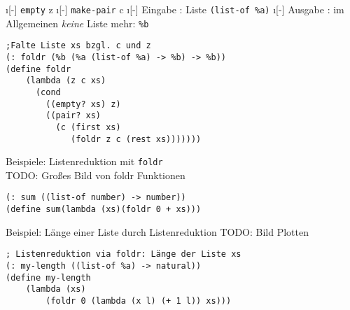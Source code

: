 \begin{itemize}
	\i[-] \lstinline|empty| \eval z
	\i[-] \lstinline|make-pair| \eval c
	\i[-] Eingabe : Liste \lstinline|(list-of %a)|
	\i[-] Ausgabe : im Allgemeinen \emph{keine} Liste mehr: \lstinline|%b|
\end{itemize}
\begin{lstlisting}
;Falte Liste xs bzgl. c und z
(: foldr (%b (%a (list-of %a) -> %b) -> %b))
(define foldr
	(lambda (z c xs)
	  (cond 
	    ((empty? xs) z)
	    ((pair? xs)
	      (c (first xs)
	         (foldr z c (rest xs)))))))
\end{lstlisting}
Beispiele: Listenreduktion mit \lstinline|foldr|\\
TODO: Gro\ss es Bild von foldr Funktionen
\begin{lstlisting}
(: sum ((list-of number) -> number))
(define sum(lambda (xs)(foldr 0 + xs)))
\end{lstlisting}
Beispiel: Länge einer Liste durch Listenreduktion
TODO: Bild Plotten
\begin{lstlisting}
; Listenreduktion via foldr: Länge der Liste xs
(: my-length ((list-of %a) -> natural))
(define my-length
	(lambda (xs)
		(foldr 0 (lambda (x l) (+ 1 l)) xs)))
\end{lstlisting}
